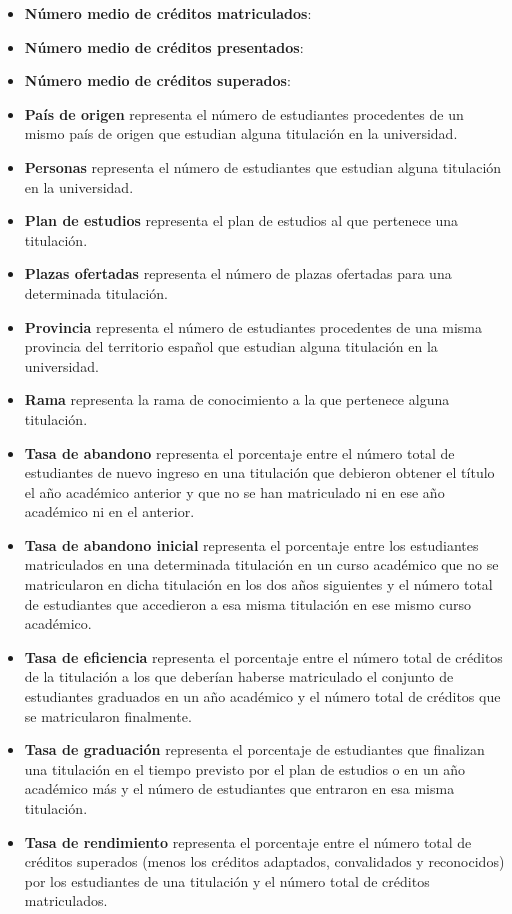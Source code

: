 \begin{itemize}
	\item \textbf{Número medio de créditos matriculados}:
	\item \textbf{Número medio de créditos presentados}:
	\item \textbf{Número medio de créditos superados}:
	\item \textbf{País de origen} representa el número de estudiantes procedentes de un mismo país de origen que estudian alguna titulación en la universidad.
	\item \textbf{Personas} representa el número de estudiantes que estudian alguna titulación en la universidad.
	\item \textbf{Plan de estudios} representa el plan de estudios al que pertenece una titulación.
	\item \textbf{Plazas ofertadas} representa el número de plazas ofertadas para una determinada titulación.
	\item \textbf{Provincia} representa el número de estudiantes procedentes de una misma provincia del territorio español que estudian alguna titulación en la universidad.
	\item \textbf{Rama} representa la rama de conocimiento a la que pertenece alguna titulación.
	\item \textbf{Tasa de abandono} representa el porcentaje entre el número total de estudiantes de nuevo ingreso en una titulación que debieron obtener el título el año académico anterior y que no se han matriculado ni en ese año académico ni en el anterior.
	\item \textbf{Tasa de abandono inicial} representa el porcentaje entre los estudiantes matriculados en una determinada titulación en un curso académico que no se matricularon en dicha titulación en los dos años siguientes y el número total de estudiantes que accedieron a esa misma titulación en ese mismo curso académico.
	\item \textbf{Tasa de eficiencia} representa el porcentaje entre el número total de créditos de la titulación a los que deberían haberse matriculado el conjunto de estudiantes graduados en un año académico y el número total de créditos que se matricularon finalmente.
	\item \textbf{Tasa de graduación} representa el porcentaje de estudiantes que finalizan una titulación en el tiempo previsto por el plan de estudios o en un año académico más y el número de estudiantes que entraron en esa misma titulación.
	\item \textbf{Tasa de rendimiento} representa el porcentaje entre el número total de créditos superados (menos los créditos adaptados, convalidados y reconocidos) por los estudiantes de una titulación y el número total de créditos matriculados.

\end{itemize}
